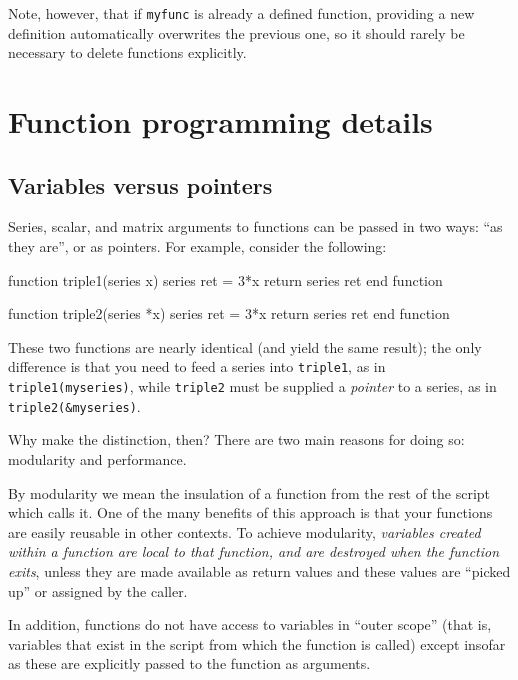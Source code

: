 Note, however, that if \texttt{myfunc} is already a defined function,
providing a new definition automatically overwrites the previous one,
so it should rarely be necessary to delete functions explicitly.

\section{Function programming details}
\label{func-details}

\subsection{Variables versus pointers}
\label{funscope}

Series, scalar, and matrix arguments to functions can be passed in two
ways: ``as they are'', or as pointers. For example, consider the
following:
\begin{code}
function triple1(series x)
  series ret = 3*x
  return series ret
end function
  
function triple2(series *x)
  series ret = 3*x
  return series ret
end function
\end{code}

These two functions are nearly identical (and yield the same result);
the only difference is that you need to feed a series into
\texttt{triple1}, as in \texttt{triple1(myseries)}, while
\texttt{triple2} must be supplied a \emph{pointer} to a series, as in
\texttt{triple2(\&myseries)}. 

Why make the distinction, then? There are two main reasons for doing
so: modularity and performance.

By modularity we mean the insulation of a function from the rest of
the script which calls it.  One of the many benefits of this approach
is that your functions are easily reusable in other contexts.  To
achieve modularity, \emph{variables created within a function are
  local to that function, and are destroyed when the function exits},
unless they are made available as return values and these values are
``picked up'' or assigned by the caller.
    
In addition, functions do not have access to variables in ``outer
scope'' (that is, variables that exist in the script from which the
function is called) except insofar as these are explicitly passed to
the function as arguments.

